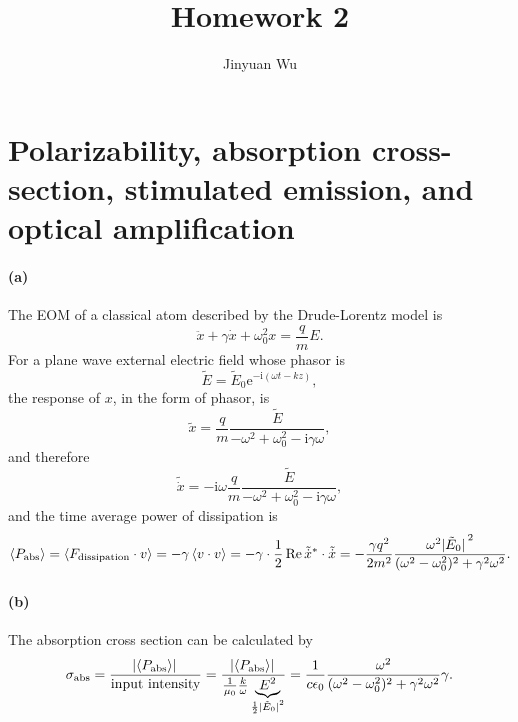 \documentclass[hyperref, a4paper]{article}
\title{Homework 2}
\author{Jinyuan Wu}
\newcommand*{\ii}{\mathrm{i}}
\newcommand*{\ee}{\mathrm{e}}
\begin{document}
\maketitle

\section{Polarizability, absorption cross-section, stimulated emission, and optical amplification}

\paragraph{(a)} The EOM of a classical atom described by the Drude-Lorentz model is 
\begin{equation}
    \ddot{x} + \gamma \dot{x} + \omega_0^2 x = \frac{q}{m} E.
\end{equation}
For a plane wave external electric field whose phasor is 
\begin{equation}
    \tilde{E} = \tilde{E}_0 \ee^{- \ii (\omega t - k z)},
\end{equation}
the response of $x$, in the form of phasor, is 
\begin{equation}
    \tilde{x} = \frac{q}{m} \frac{\tilde{E}}{- \omega^2 + \omega_0^2 - \ii \gamma \omega},
\end{equation}
and therefore 
\begin{equation}
    \tilde{\dot{x}} = - \ii \omega \frac{q}{m} \frac{\tilde{E}}{- \omega^2 + \omega_0^2 - \ii \gamma \omega},
\end{equation}
and the time average power of dissipation is 
\begin{equation}
    \expval{P_\text{abs}} = \expval{F_\text{dissipation} \cdot v} 
    = - \gamma \expval{v \cdot v} = - \gamma \cdot \frac{1}{2} \Re \tilde{\dot{x}}^* \cdot \tilde{\dot{x}}
    = - \frac{\gamma q^2}{2 m^2} \frac{\omega^2 \abs*{\tilde{E}_0}^2}{
        (\omega^2 - \omega_0^2)^2 + \gamma^2 \omega^2
    }.
\end{equation}

\paragraph{(b)} The absorption cross section can be calculated by 
\begin{equation}
    \sigma_\text{abs} = \frac{\abs*{\expval{P_\text{abs}}}}{\text{input intensity}}
    = \frac{\abs*{\expval{P_\text{abs}}}}{
        \frac{1}{\mu_0} \frac{k}{\omega} \underbrace{
            E^2
        }_{\frac{1}{2} \abs*{\tilde{E}_0}^2}   
    }
    = \frac{1}{c \epsilon_0} \frac{\omega^2}{
        (\omega^2 - \omega_0^2)^2 + \gamma^2 \omega^2
    } \gamma.
\end{equation}
\end{document}
